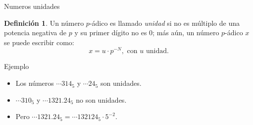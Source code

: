 \documentclass{beamer}
\theoremstyle{definition}
\numberwithin{equation}{section}
\newcommand{\marine}[1]{\textcolor{defColor}{#1}}
\newtheorem{df}{\marine{Definición}}
\begin{document}

\begin{frame}{Numeros unidades}
	\begin{df}
		Un número $p$-ádico es llamado \textit{unidad} si no es múltiplo de una potencia negativa de $p$ y su primer dígito no es $0$; más aún, un número $p$-ádico $x$ se puede escribir como:
		$${x=u\cdot p^{-N}},\text{ con $u$ unidad}.$$	
	\end{df}
	\begin{exampleblock}{Ejemplo}
		\begin{itemize}[<+- | alert@+>]
			\item Los números $\cdots314_5$ y $\cdots24_5$ son unidades.
			\item  $\cdots310_5$ y $\cdots1321.24_5$ no son unidades.
			\item Pero $\cdots 1321.24_5 = \cdots 132124_5\cdot 5^{-2}.$
		\end{itemize}

	\end{exampleblock}


\end{frame}
\end{document}
